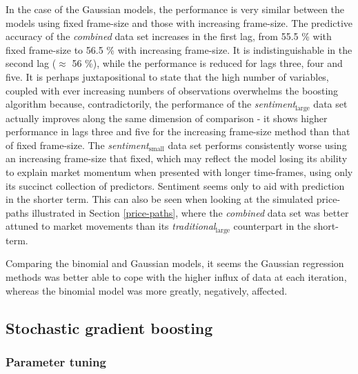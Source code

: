 \documentclass{article}
\begin{document}
In the case of the Gaussian models, the performance is very similar between the models using fixed frame-size and those with increasing frame-size. The predictive accuracy of the \emph{combined} data set increases in the first lag, from 55.5 \% with fixed frame-size to 56.5 \% with increasing frame-size. It is indistinguishable in the second lag ($\approx$ 56 \%), while the performance is reduced for lags three, four and five. It is perhaps juxtapositional to state that the high number of variables, coupled with ever increasing numbers of observations overwhelms the boosting algorithm because, contradictorily, the performance of the \emph{sentiment$_{\text{large}}$} data set actually improves along the same dimension of comparison - it shows higher performance in lags three and five for the increasing frame-size method than that of fixed frame-size. The \emph{sentiment$_{\text{small}}$} data set performs consistently worse using an increasing frame-size that fixed, which may reflect the model losing its ability to explain market momentum when presented with longer time-frames, using only its succinct collection of predictors. Sentiment seems only to aid with prediction in the shorter term. This can also be seen when looking at the simulated price-paths illustrated in Section \ref{price-paths}, where the \emph{combined} data set was better attuned to market movements than its \emph{traditional$_{\text{large}}$} counterpart in the short-term.

Comparing the binomial and Gaussian models, it seems the Gaussian regression methods was better able to cope with the higher influx of data at each iteration, whereas the binomial model was more greatly, negatively, affected.



\subsection{Stochastic gradient boosting \label{stochastic-boosting}}
\label{sec-6-5}


\subsubsection{Parameter tuning}
\label{sec-6-5-1}
\end{document}
